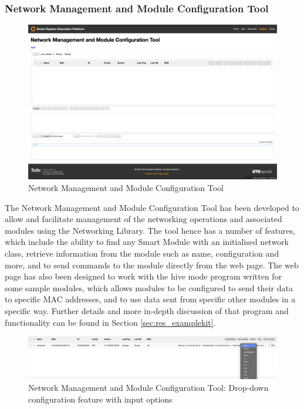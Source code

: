 \subsubsection{\label{sec:res_nmmct}Network Management and Module Configuration Tool}

\begin{figure}[H]
    \centering
    \includegraphics[width=\linewidth]{overleaf/images/nmmct_raw.png}
    \vspace{\ftspace}
    \caption{Network Management and Module Configuration Tool}
    \vspace{\ftspace}
    \label{fig:nmmct_raw}
\end{figure}

The Network Management and Module Configuration Tool has been developed to allow and facilitate management of the networking operations and associated modules using the Networking Library. The tool hence has a number of features, which include the ability to find any Smart Module with an initialised network class, retrieve information from the module such as name, configuration and more, and to send commands to the module directly from the web page. The web page has also been designed to work with the hive mode program written for some sample modules, which allows modules to be configured to send their data to specific MAC addresses, and to use data sent from specific other modules in a specific way. Further details and more in-depth discussion of that program and functionality can be found in Section \ref{sec:res_examplekit}.

\begin{figure}[H]
    \centering
    \includegraphics[width=\linewidth]{overleaf/images/nmmct_drop2.png}
    \vspace{\ftspace}
    \caption{Network Management and Module Configuration Tool: Drop-down configuration feature with input options}
    \vspace{\ftspace}
    \label{fig:nmmct_drop}
\end{figure}

